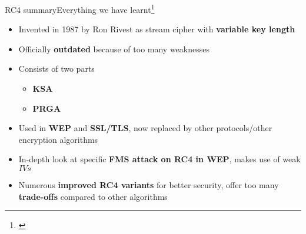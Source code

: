 \documentclass[
	aspectratio=169,	%
	onlytextwidth,		%
	t					%
	]{beamer}
\begin{document}
\begin{frame}[fragile]{RC4 summary}{Everything we have learnt\footnote[frame]{\cite{stamp2007applied}}}
	\begin{itemize}[<+->]
		\item Invented in 1987 by Ron Rivest as stream cipher with \textbf{variable key length}
		\item Officially \textbf{outdated} because of too many weaknesses
		\item Consists of two parts
		\begin{itemize}
			\item \textbf{KSA}
			\item \textbf{PRGA}
		\end{itemize}
		\item Used in \textbf{WEP} and \textbf{SSL/TLS}, now replaced by other protocols/other encryption algorithms
		\item In-depth look at specific \textbf{FMS attack on RC4 in WEP}, makes use of weak $IVs$
		\item Numerous \textbf{improved RC4 variants} for better security, offer too many \textbf{trade-offs} compared to other algorithms
	\end{itemize}
\end{frame}

\appendix

\makethankyou

\begin{frame}[allowframebreaks]
	\printbibliography
\end{frame}
\end{document}

